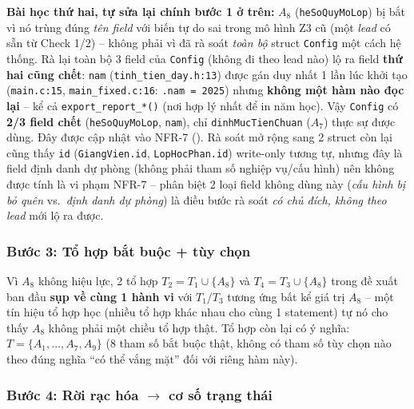 \textbf{Bài học thứ hai, tự sửa lại chính bước 1 ở trên:} $A_8$ (\texttt{heSoQuyMoLop}) bị bắt vì nó trùng đúng \emph{tên field} với biến tự do sai trong mô hình Z3 cũ (một \emph{lead} có sẵn từ Check 1/2) -- không phải vì đã rà soát \emph{toàn bộ} struct \texttt{Config} một cách hệ thống. Rà lại toàn bộ 3 field của \texttt{Config} (không đi theo lead nào) lộ ra field \textbf{thứ hai cũng chết}: \texttt{nam} (\texttt{tinh\_tien\_day.h:13}) được gán duy nhất 1 lần lúc khởi tạo (\texttt{main.c:15}, \texttt{main\_fixed.c:16}: \texttt{.nam = 2025}) nhưng \textbf{không một hàm nào đọc lại} -- kể cả \texttt{export\_report\_*()} (nơi hợp lý nhất để in năm học). Vậy \texttt{Config} có \textbf{2/3 field chết} (\texttt{heSoQuyMoLop}, \texttt{nam}), chỉ \texttt{dinhMucTienChuan} ($A_7$) thực sự được dùng. Đây được cập nhật vào NFR-7 (). Rà soát mở rộng sang 2 struct còn lại cũng thấy \texttt{id} (\texttt{GiangVien.id}, \texttt{LopHocPhan.id}) write-only tương tự, nhưng đây là field định danh dự phòng (không phải tham số nghiệp vụ/cấu hình) nên không được tính là vi phạm NFR-7 -- phân biệt 2 loại field không dùng này (\emph{cấu hình bị bỏ quên} vs.\ \emph{định danh dự phòng}) là điều bước rà soát \emph{có chủ đích, không theo lead} mới lộ ra được.

\subsubsection*{Bước 3: Tổ hợp bắt buộc + tùy chọn}

Vì $A_8$ không hiệu lực, 2 tổ hợp $T_2=T_1\cup\{A_8\}$ và $T_4=T_3\cup\{A_8\}$ trong đề xuất ban đầu \textbf{sụp về cùng 1 hành vi} với $T_1$/$T_3$ tương ứng bất kể giá trị $A_8$ -- một tín hiệu tổ hợp học (nhiều tổ hợp khác nhau cho cùng 1 statement) tự nó cho thấy $A_8$ không phải một chiều tổ hợp thật. Tổ hợp còn lại có ý nghĩa: $T = \{A_1,\dots,A_7,A_9\}$ (8 tham số bắt buộc thật, không có tham số tùy chọn nào theo đúng nghĩa ``có thể vắng mặt'' đối với riêng hàm này).

\subsubsection*{Bước 4: Rời rạc hóa $\to$ cơ số trạng thái}

